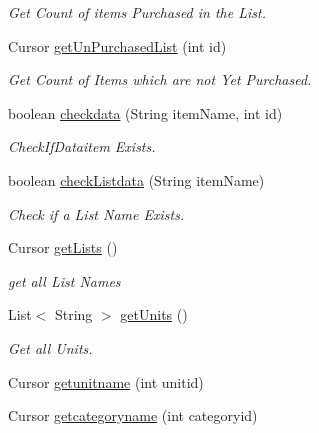 \begin{DoxyCompactItemize}
\begin{DoxyCompactList}\small\item\em Get Count of items Purchased in the List. \end{DoxyCompactList}\item 
Cursor \hyperlink{classcom_1_1example_1_1santh_1_1shoppinglist_1_1_data_base_manager_ae9646927170d242e1727f5be44778b04}{get\+Un\+Purchased\+List} (int id)
\begin{DoxyCompactList}\small\item\em Get Count of Items which are not Yet Purchased. \end{DoxyCompactList}\item 
boolean \hyperlink{classcom_1_1example_1_1santh_1_1shoppinglist_1_1_data_base_manager_a84ee149222f9b8c6aeff90904db86df8}{checkdata} (String item\+Name, int id)
\begin{DoxyCompactList}\small\item\em Check\+If\+Dataitem Exists. \end{DoxyCompactList}\item 
boolean \hyperlink{classcom_1_1example_1_1santh_1_1shoppinglist_1_1_data_base_manager_a56a7c1db72d0a27b31bd26facae87bc0}{check\+Listdata} (String item\+Name)
\begin{DoxyCompactList}\small\item\em Check if a List Name Exists. \end{DoxyCompactList}\item 
Cursor \hyperlink{classcom_1_1example_1_1santh_1_1shoppinglist_1_1_data_base_manager_a481240bf420f4e57240eee75c396f034}{get\+Lists} ()
\begin{DoxyCompactList}\small\item\em get all List Names \end{DoxyCompactList}\item 
List$<$ String $>$ \hyperlink{classcom_1_1example_1_1santh_1_1shoppinglist_1_1_data_base_manager_ad88a038d25f0248937118787296a76ba}{get\+Units} ()
\begin{DoxyCompactList}\small\item\em Get all Units. \end{DoxyCompactList}\item 
Cursor \hyperlink{classcom_1_1example_1_1santh_1_1shoppinglist_1_1_data_base_manager_abdc53399fddf45780c6982c500a87cb2}{getunitname} (int unitid)
\item 
Cursor \hyperlink{classcom_1_1example_1_1santh_1_1shoppinglist_1_1_data_base_manager_a42642480f4b6994d40939638eb9348e8}{getcategoryname} (int categoryid)

\end{DoxyCompactItemize}
